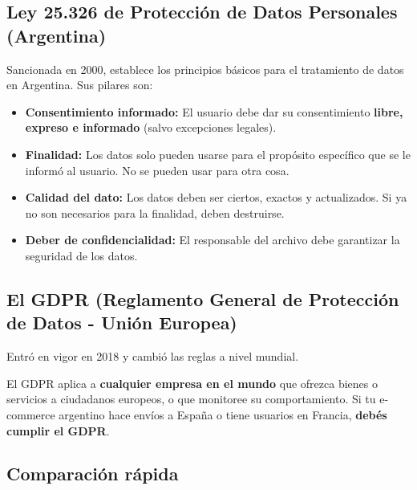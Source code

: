 \documentclass[12pt,a4paper]{article}
\begin{document}
\subsection{Ley 25.326 de Protecci\'on de Datos Personales (Argentina)}
Sancionada en 2000, establece los principios b\'asicos para el tratamiento de datos en Argentina. Sus pilares son:
\begin{itemize}[leftmargin=2em]
    \item \textbf{Consentimiento informado:} El usuario debe dar su consentimiento \textbf{libre, expreso e informado} (salvo excepciones legales).
    \item \textbf{Finalidad:} Los datos solo pueden usarse para el prop\'osito espec\'ifico que se le inform\'o al usuario. No se pueden usar para otra cosa.
    \item \textbf{Calidad del dato:} Los datos deben ser ciertos, exactos y actualizados. Si ya no son necesarios para la finalidad, deben destruirse.
    \item \textbf{Deber de confidencialidad:} El responsable del archivo debe garantizar la seguridad de los datos.
\end{itemize}

\subsection{El GDPR (Reglamento General de Protecci\'on de Datos - Uni\'on Europea)}
Entr\'o en vigor en 2018 y cambi\'o las reglas a nivel mundial. 
\begin{cajaLegal}[title={El efecto extraterritorial}]
El GDPR aplica a \textbf{cualquier empresa en el mundo} que ofrezca bienes o servicios a ciudadanos europeos, o que monitoree su comportamiento. Si tu e-commerce argentino hace env\'ios a Espa\~na o tiene usuarios en Francia, \textbf{deb\'es cumplir el GDPR}.
\end{cajaLegal}

\subsection{Comparaci\'on r\'apida}
\end{document}
